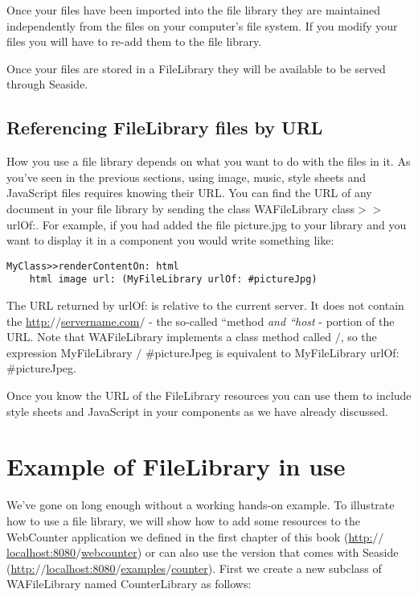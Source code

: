 \documentclass[a4paper,10pt,twoside]{book}
\newcommand{\ct}[1]{{\small\ttfamily\textup{#1}}}
\begin{document}
Once your files have been imported into the file library they are maintained independently from the files on your computer's file system. If you modify your files you will have to re-add them to the file library.

Once your files are stored in a FileLibrary they will be available to be served through Seaside.

\subsection{Referencing FileLibrary files by URL}
\label{book:inaction:servingfiles:filelibraries:including}

How you use a file library depends on what you want to do with the files in it. As you've seen in the previous sections, using image, music, style sheets and JavaScript files requires knowing their URL. You can find the URL of any document in your file library by sending the class \ct{WAFileLibrary class$>$$>$urlOf:}. For example, if you had added the file \ct{picture.jpg} to your library and you want to display it in a component you would write something like: 

\begin{lstlisting}
MyClass>>renderContentOn: html
    html image url: (MyFileLibrary urlOf: #pictureJpg)
\end{lstlisting}

The URL returned by  \ct{urlOf:} is relative to the current server. It does not contain the \href{http://servername.com/}{http:$/$$/$servername.com$/$} - the so-called ``method\textit{ and ``host} - portion of the URL. Note that WAFileLibrary implements a class method called \ct{$/$}, so the expression \ct{MyFileLibrary $/$ \#pictureJpeg} is equivalent to \ct{MyFileLibrary urlOf: \#pictureJpeg}.

Once you know the URL of the FileLibrary resources you can use them to include style sheets and JavaScript in your components as we have already discussed.

\section{Example of FileLibrary in use}
\label{book:inaction:servingfiles:enhancingcounter}

We've gone on long enough without a working hands-on example. To illustrate how to use a file library, we will show how to add some resources to the WebCounter application we defined in the first chapter of this  book (\href{http://localhost:8080/webcounter}{http:$/$$/$localhost:8080$/$webcounter}) or can also use the version that comes with Seaside (\href{http://localhost:8080/examples/counter}{http:$/$$/$localhost:8080$/$examples$/$counter}). First we create a new subclass of  \ct{WAFileLibrary} named \ct{CounterLibrary} as follows:
\end{document}
